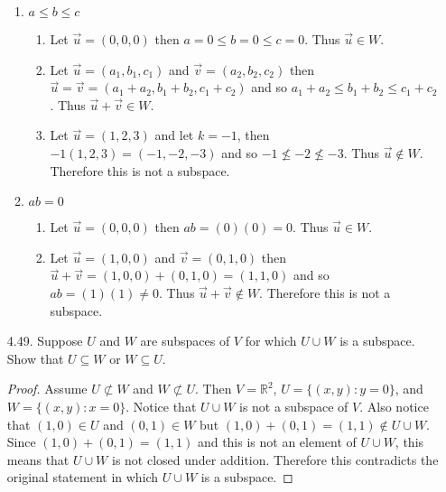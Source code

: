 \documentclass[12pt]{article}
\begin{document}
\begin{enumerate}
\begin{enumerate}
	\item $a \leq b \leq c$
		\begin{enumerate}
		\item Let $\vec{u} = (0,0,0)$ then $a = 0 \leq b = 0 \leq c = 0$. Thus $\vec{u} \in W$.
		\item Let $\vec{u} = (a_1,b_1,c_1)$ and $\vec{v} = (a_2,b_2,c_2)$ then $\vec{u} = \vec{v} = (a_1+a_2,b_1+b_2,c_1+c_2)$ and so $a_1+a_2 \leq b_1+b_2 \leq c_1+c_2$. Thus $\vec{u} + \vec{v} \in W$.
		\item Let $\vec{u} = (1,2,3)$ and let $k=-1$, then $-1(1,2,3)=(-1,-2,-3)$ and so $-1 \not\leq -2 \not\leq -3$. Thus $\vec{u} \not\in W$. Therefore this is not a subspace.
		\end{enumerate}
		
	\item $ab=0$
		\begin{enumerate}
		\item Let $\vec{u} = (0,0,0)$ then $ab=(0)(0) = 0$. Thus $\vec{u} \in W$.
		\item Let $\vec{u} = (1,0,0)$ and $\vec{v} = (0,1,0)$ then $\vec{u} + \vec{v} = (1,0,0)+(0,1,0)=(1,1,0)$ and so $ab=(1)(1) \neq 0$. Thus $\vec{u}+\vec{v} \not\in W$. Therefore this is not a subspace.
		\end{enumerate}
	\end{enumerate}

\item[4.49.] Suppose $U$ and $W$ are subspaces of $V$ for which $U \cup W$ is a subspace. Show that $U \subseteq W$ or $W \subseteq U$.
	\begin{proof}
	Assume $U \not\subset W$ and $W \not\subset U$. Then $V=\mathbb{R}^2$, $U=\{(x,y):y=0\}$, and $W=\{(x,y):x=0\}$. Notice that $U \cup W$ is not a subspace of $V$. Also notice that $(1,0)\in U$ and $(0,1) \in W$ but $(1,0)+(0,1)=(1,1) \not\in U \cup W$. Since $(1,0)+(0,1)=(1,1)$ and this is not an element of $U \cup W$, this means that $U \cup W$ is not closed under addition. Therefore this contradicts the original statement in which $U \cup W$ is a subspace.
	\end{proof}


\end{enumerate}
\end{document}
